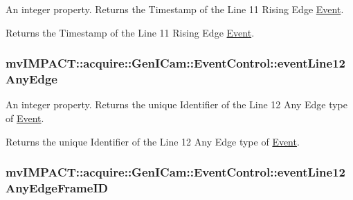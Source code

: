 An integer property. Returns the Timestamp of the Line 11 Rising Edge \hyperlink{classmv_i_m_p_a_c_t_1_1acquire_1_1_event}{Event}. 

Returns the Timestamp of the Line 11 Rising Edge \hyperlink{classmv_i_m_p_a_c_t_1_1acquire_1_1_event}{Event}. \hypertarget{classmv_i_m_p_a_c_t_1_1acquire_1_1_gen_i_cam_1_1_event_control_a76b45cd200b68eef1bdc77586b303ea7}{
\subsubsection[{event\+Line12\+Any\+Edge}]{ mv\+I\+M\+P\+A\+C\+T\+::acquire\+::\+Gen\+I\+Cam\+::\+Event\+Control\+::event\+Line12\+Any\+Edge}}\label{classmv_i_m_p_a_c_t_1_1acquire_1_1_gen_i_cam_1_1_event_control_a76b45cd200b68eef1bdc77586b303ea7}


An integer property. Returns the unique Identifier of the Line 12 Any Edge type of \hyperlink{classmv_i_m_p_a_c_t_1_1acquire_1_1_event}{Event}. 

Returns the unique Identifier of the Line 12 Any Edge type of \hyperlink{classmv_i_m_p_a_c_t_1_1acquire_1_1_event}{Event}. \hypertarget{classmv_i_m_p_a_c_t_1_1acquire_1_1_gen_i_cam_1_1_event_control_a26f5d0d0e86a8b06734ff3dec1b1bbd8}{
\subsubsection[{event\+Line12\+Any\+Edge\+Frame\+I\+D}]{ mv\+I\+M\+P\+A\+C\+T\+::acquire\+::\+Gen\+I\+Cam\+::\+Event\+Control\+::event\+Line12\+Any\+Edge\+Frame\+I\+D}}\label{classmv_i_m_p_a_c_t_1_1acquire_1_1_gen_i_cam_1_1_event_control_a26f5d0d0e86a8b06734ff3dec1b1bbd8}


